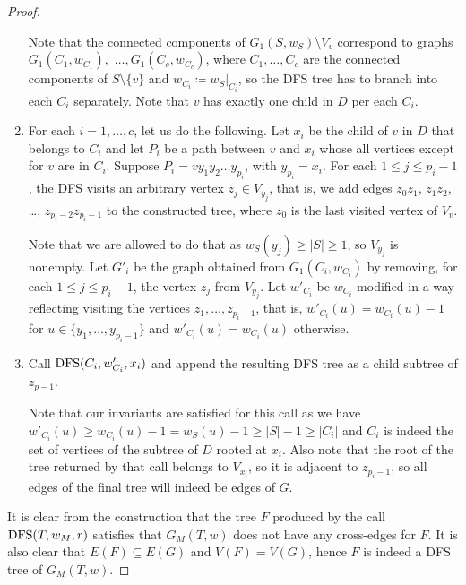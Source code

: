 \documentclass[a4paper,11pt]{article}
\begin{document}
\begin{proof}
\begin{enumerate}
    Note that the connected components of $G_1(S, w_S) \setminus V_v$ correspond to graphs $G_1(C_1, w_{C_1}),$ $\ldots, G_1(C_c, w_{C_c})$, where $C_1, \ldots, C_c$ are the connected components of $S \setminus \{v\}$ and $w_{C_i} \coloneqq w_S|_{C_i}$, so the DFS tree has to branch into each $C_i$ separately.
    Note that $v$ has exactly one child in $D$ per each $C_i$. 
	\item For each $i=1, \ldots, c$, let us do the following. Let $x_i$ be the child of $v$ in $D$ that belongs to $C_i$ and let $P_i$ be a path between $v$ and $x_i$ whose all vertices except for $v$ are in $C_i$. Suppose $P_i=vy_1y_2\ldots y_{p_i}$, with $y_{p_i}=x_i$. For each $1\leq j \le p_i-1$, the DFS visits an arbitrary vertex $z_j\in V_{y_j}$, that is, we add edges $z_0z_1$, $z_1z_2$, \ldots, $z_{p_i-2}z_{p_i-1}$ to the constructed tree, where $z_0$ is the last visited vertex of $V_v$.
	 
    Note that we are allowed to do that as $w_S(y_j) \ge |S| \ge 1$, so $V_{y_j}$ is nonempty. Let $G'_i$ be the graph obtained from $G_1(C_i, w_{C_i})$ by removing, for each $1\leq j\leq p_i - 1$, the vertex $z_j$ from $V_{y_j}$. Let $w'_{C_i}$ be $w_{C_i}$ modified in a way reflecting visiting the vertices $z_1, \ldots, z_{p_i-1}$, that is, 
    $w'_{C_i}(u) = w_{C_i}(u)-1$ 
    for $u \in \{y_1, \ldots, y_{p_i-1}\}$ and $w'_{C_i}(u) = w_{C_i}(u)$ otherwise.
    \item Call $\mathrm{DFS}(C_i,w'_{C_i},x_i)$ and append the resulting DFS tree as a child subtree of $z_{p-1}$.
 
    Note that our invariants are satisfied for this call as we have $w'_{C_i}(u) \ge w_{C_i}(u) -1 = w_{S}(u) -1 \ge |S|-1 \ge |C_i|$ and $C_i$ is indeed the set of vertices of the subtree of $D$ rooted at $x_i$. Also note that the root of the tree returned by that call belongs to $V_{x_i}$, so it is adjacent to $z_{p_i-1}$, so all edges of the final tree will indeed be edges of $G$.
\end{enumerate}

It is clear from the construction that the tree $F$ produced by the call $\mathrm{DFS}(T, w_M, r)$ satisfies that $G_M(T, w)$ does not have any cross-edges for $F$. It is also clear that $E(F) \subseteq E(G)$ and $V(F) = V(G)$, hence $F$ is indeed a DFS tree of $G_M(T, w)$. 


\end{proof}
\end{document}
